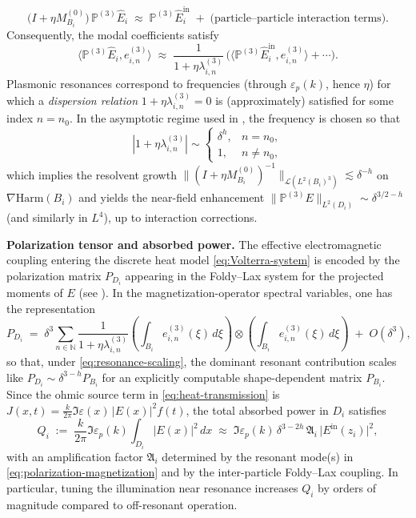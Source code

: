 \documentclass[11pt,a4paper]{article}
\numberwithin{equation}{section}
\theoremstyle{definition}
\newcommand{\eps}{\varepsilon}
\newcommand{\1}{\mathbbm{1}}
\begin{document}
\begin{equation}
\label{eq:mode-balance}
\bigl(I+\eta M^{(0)}_{B_i}\bigr)\,\mathbb P^{(3)}\widehat E_i
\;\approx\; \mathbb P^{(3)}\widehat E^{\mathrm{in}}_i \;+\; \text{(particle--particle interaction terms)}.
\end{equation}
Consequently, the modal coefficients satisfy
\[
\langle \mathbb P^{(3)}\widehat E_i, e^{(3)}_{i,n}\rangle
\;\approx\; \frac{1}{1+\eta\lambda^{(3)}_{i,n}}\,
\Big(\langle \mathbb P^{(3)}\widehat E^{\mathrm{in}}_i, e^{(3)}_{i,n}\rangle+\cdots\Big).
\]
Plasmonic resonances correspond to frequencies (through $\eps_p(k)$, hence $\eta$)
for which a \emph{dispersion relation} $1+\eta\lambda^{(3)}_{i,n}=0$ is (approximately)
satisfied for some index $n=n_0$. In the asymptotic regime used in
\cite{CaoMukherjeeSini2025}, the frequency is chosen so that
\begin{equation}
\label{eq:resonance-scaling}
|1+\eta\lambda^{(3)}_{i,n}|\sim
\begin{cases}
\delta^{h}, & n=n_0,\\
1, & n\neq n_0,
\end{cases}
\end{equation}
which implies the resolvent growth
$\|(I+\eta M^{(0)}_{B_i})^{-1}\|_{\mathcal L(L^2(B_i)^3)}\lesssim \delta^{-h}$ on
$\nabla\mathrm{Harm}(B_i)$ and yields the near-field enhancement
$\|\mathbb P^{(3)}E\|_{L^2(D_i)} \sim \delta^{3/2-h}$ (and similarly in $L^4$), up to
interaction corrections.

\medskip
\noindent
\textbf{Polarization tensor and absorbed power.}
The effective electromagnetic coupling entering the discrete heat model
\eqref{eq:Volterra-system} is encoded by the polarization matrix $P_{D_i}$ appearing
in the Foldy--Lax system for the projected moments of $E$ (see \cite{CaoMukherjeeSini2025}).
In the magnetization-operator spectral variables, one has the representation
\begin{equation}
\label{eq:polarization-magnetization}
P_{D_i} \;=\; \delta^3 \sum_{n\in\mathbb N}\frac{1}{1+\eta\lambda^{(3)}_{i,n}}
\left(\int_{B_i} e^{(3)}_{i,n}(\xi)\,d\xi\right)\otimes
\left(\int_{B_i} e^{(3)}_{i,n}(\xi)\,d\xi\right)
\;+\; O(\delta^3),
\end{equation}
so that, under \eqref{eq:resonance-scaling}, the dominant resonant contribution scales like
$P_{D_i}\sim \delta^{3-h} P_{B_i}$ for an explicitly computable shape-dependent matrix
$P_{B_i}$.
Since the ohmic source term in \eqref{eq:heat-transmission} is
$J(x,t)=\frac{k}{2\pi}\Im\eps(x)\,|E(x)|^2 f(t)$, the total absorbed power in $D_i$ satisfies
\begin{equation}\label{Q_i-s}
Q_i \;:=\; \frac{k}{2\pi}\Im\eps_p(k)\int_{D_i}|E(x)|^2\,dx
\;\approx\; \Im\eps_p(k)\, \delta^{3-2h}\,\mathfrak A_i \,\big|E^{\mathrm{in}}(z_i)\big|^2,
\end{equation}
with an amplification factor $\mathfrak A_i$ determined by the resonant mode(s) in
\eqref{eq:polarization-magnetization} and by the inter-particle Foldy--Lax coupling.
In particular, tuning the illumination near resonance increases $Q_i$ by orders of
magnitude compared to off-resonant operation.
\end{document}
